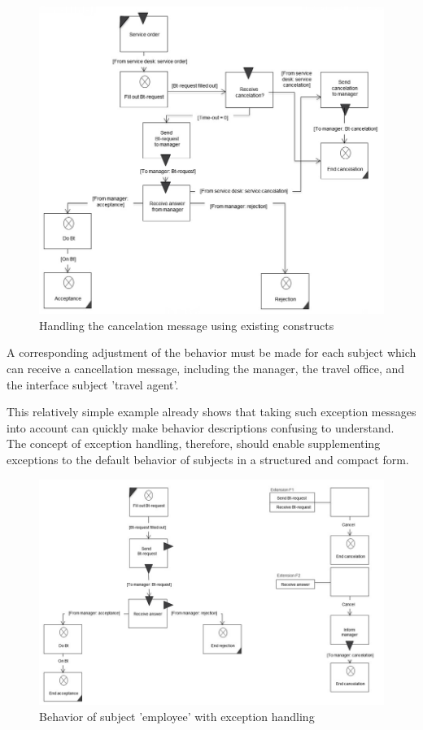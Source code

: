\begin{figure}[htbp]
	\centering
	\includegraphics[width=0.7\linewidth]{Figures/Ontology/SubjectExecution/ExceptionHandling}
	\caption[Handling the cancelation message using existing constructs]{Handling the cancelation message using existing constructs}
	\label{fig:exceptionhandling}
\end{figure}

A corresponding adjustment of the behavior must be made for each subject which can receive a cancellation message, including the manager, the travel office, and the interface subject 'travel agent'.

This relatively simple example already shows that taking such exception messages into account can quickly make behavior descriptions confusing to understand. The concept of exception handling, therefore, should enable supplementing exceptions to the default behavior of subjects in a structured and compact form. 

\begin{figure}[htbp]
	\centering
	\includegraphics[width=0.7\linewidth]{Figures/Ontology/SubjectExecution/Extension}
	\caption[Behavior of subject 'employee' with exception handling]{Behavior of subject 'employee' with exception handling}
	\label{fig:extension}
\end{figure}

